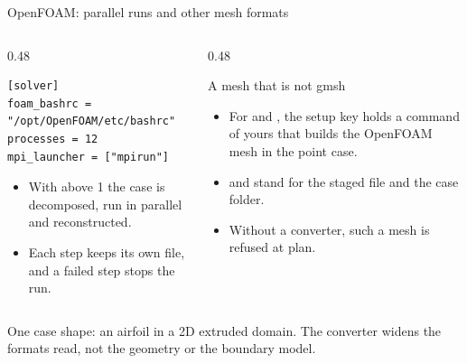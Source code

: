 \begin{frame}[fragile]{OpenFOAM: parallel runs and other mesh formats}
\begin{columns}[T]
\begin{column}{0.48\textwidth}
\begin{lstlisting}[style=cfdbtoml]
[solver]
foam_bashrc = "/opt/OpenFOAM/etc/bashrc"
processes = 12
mpi_launcher = ["mpirun"]
\end{lstlisting}
\begin{itemize}\small
  \item With  above 1 the case is decomposed, run in
        parallel and reconstructed.
  \item Each step keeps its own  file, and a failed step stops
        the run.
\end{itemize}
\end{column}
\begin{column}{0.48\textwidth}
\begin{block}{A mesh that is not gmsh}
\begin{itemize}\small
  \item For  and , the setup key
         holds a command of yours that builds the
        OpenFOAM mesh in the point case.
  \item {} and  stand for the staged file and
        the case folder.
  \item Without a converter, such a mesh is refused at plan.
\end{itemize}
\end{block}
\end{column}
\end{columns}
\begin{cfdblimit}
One case shape: an airfoil in a 2D extruded domain. The converter widens the
formats read, not the geometry or the boundary model.
\end{cfdblimit}
\end{frame}

